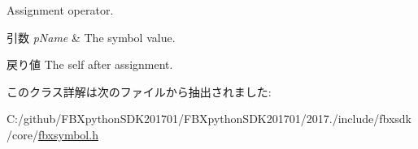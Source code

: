 Assignment operator. 
\begin{DoxyParams}{引数}
{\em p\+Name} & The symbol value. \\
\hline
\end{DoxyParams}
\begin{DoxyReturn}{戻り値}
The self after assignment. 
\end{DoxyReturn}


このクラス詳解は次のファイルから抽出されました\+:\begin{DoxyCompactItemize}
\item 
C\+:/github/\+F\+B\+Xpython\+S\+D\+K201701/\+F\+B\+Xpython\+S\+D\+K201701/2017./include/fbxsdk/core/\hyperlink{fbxsymbol_8h}{fbxsymbol.\+h}\end{DoxyCompactItemize}
